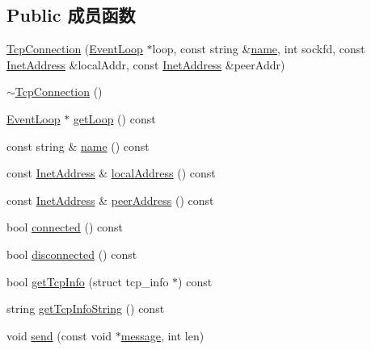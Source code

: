 \subsection*{Public 成员函数}
\begin{DoxyCompactItemize}
\item 
\hyperlink{classmuduo_1_1net_1_1TcpConnection_a2603ff299e8c8769208e266171558556}{Tcp\+Connection} (\hyperlink{classmuduo_1_1net_1_1EventLoop}{Event\+Loop} $\ast$loop, const string \&\hyperlink{classmuduo_1_1net_1_1TcpConnection_a47f4f0a66d5a539e687100dc65462ced}{name}, int sockfd, const \hyperlink{classmuduo_1_1net_1_1InetAddress}{Inet\+Address} \&local\+Addr, const \hyperlink{classmuduo_1_1net_1_1InetAddress}{Inet\+Address} \&peer\+Addr)
\item 
\hyperlink{classmuduo_1_1net_1_1TcpConnection_a0a3551d2f9a37ccec8f9cb913e73878a}{$\sim$\+Tcp\+Connection} ()
\item 
\hyperlink{classmuduo_1_1net_1_1EventLoop}{Event\+Loop} $\ast$ \hyperlink{classmuduo_1_1net_1_1TcpConnection_aef1cbfe0592e8196e6c81b4db82a39ce}{get\+Loop} () const
\item 
const string \& \hyperlink{classmuduo_1_1net_1_1TcpConnection_a47f4f0a66d5a539e687100dc65462ced}{name} () const
\item 
const \hyperlink{classmuduo_1_1net_1_1InetAddress}{Inet\+Address} \& \hyperlink{classmuduo_1_1net_1_1TcpConnection_a4044c56d2e5bcc7549f5f8f2f2eae975}{local\+Address} () const
\item 
const \hyperlink{classmuduo_1_1net_1_1InetAddress}{Inet\+Address} \& \hyperlink{classmuduo_1_1net_1_1TcpConnection_a4fcf3842d90c471bb6939afd04bba128}{peer\+Address} () const
\item 
bool \hyperlink{classmuduo_1_1net_1_1TcpConnection_aa0fd96bc25e3d509fb54028c2e4b91f6}{connected} () const
\item 
bool \hyperlink{classmuduo_1_1net_1_1TcpConnection_a69413dc574470cdba5981d3e05250f7b}{disconnected} () const
\item 
bool \hyperlink{classmuduo_1_1net_1_1TcpConnection_a1de4ddf8b40138039f3382ec9c4a0366}{get\+Tcp\+Info} (struct tcp\+\_\+info $\ast$) const
\item 
string \hyperlink{classmuduo_1_1net_1_1TcpConnection_a60514adf97e4a2d28f74ff39a5275bde}{get\+Tcp\+Info\+String} () const
\item 
void \hyperlink{classmuduo_1_1net_1_1TcpConnection_a9c8ef4c9c94e6ccd8cb7233d6ecb9834}{send} (const void $\ast$\hyperlink{test13_8cc_a36bd74109f547f7f8198faf5a12d2879}{message}, int len)

\end{DoxyCompactItemize}
